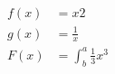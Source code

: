 \documentclass{article}
\begin{document}
	\begin{align*}
		f(x) &= x2\\
		g(x) &= \frac{1}{x}\\
		F(x) &= \int^a_b
		\frac{1}{3}x^3
	\end{align*}
\end{document}
